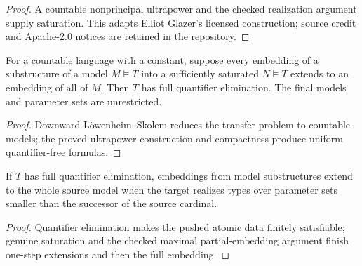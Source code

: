 \begin{proof}


\leanok

A countable nonprincipal ultrapower and the checked realization argument
supply saturation. This adapts Elliot Glazer's licensed construction; source
credit and Apache-2.0 notices are retained in the repository.

\end{proof}

\begin{theorem}

\label{sat-criterion}


\leanok

For a countable language with a constant, suppose every embedding of a
substructure of a model $M\models T$ into a sufficiently saturated
$N\models T$ extends to an embedding of all of $M$. Then $T$ has full
quantifier elimination. The final models and parameter sets are unrestricted.

\end{theorem}

\begin{proof}


\leanok

Downward L\"owenheim--Skolem reduces the transfer problem to countable
models; the proved ultrapower construction and compactness produce uniform
quantifier-free formulas.

\end{proof}

\begin{theorem}

\label{qe-extension}


\leanok

If $T$ has full quantifier elimination, embeddings from model
substructures extend to the whole source model when the target realizes
types over parameter sets smaller than the successor of the source cardinal.

\end{theorem}

\begin{proof}


\leanok

Quantifier elimination makes the pushed atomic data finitely satisfiable;
genuine saturation and the checked maximal partial-embedding argument finish
one-step extensions and then the full embedding.

\end{proof}

